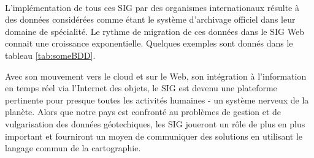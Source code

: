 \paragraph{}
L’implémentation de tous ces SIG par des organismes internationaux résulte à des données considérées 
comme étant le système d’archivage officiel dans leur domaine de spécialité.
Le rythme de migration de ces données dans le SIG Web connait une croissance exponentielle. 
Quelques exemples sont donnés dans le tableau \ref{tab:someBDD}.
\par
Avec son mouvement vers le cloud et sur le Web, son intégration à l'information 
en temps réel via l'Internet des objets, le SIG est devenu une plateforme 
pertinente pour presque toutes les activités humaines - un système nerveux de 
la planète. Alors que notre pays est confronté au problèmes de gestion et de vulgarisation 
des données géotechiques, les SIG joueront un rôle de plus 
en plus important et 
fourniront un moyen de communiquer des solutions en utilisant le langage commun de 
la cartographie.

